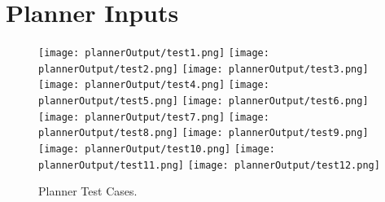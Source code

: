 
\section{Planner Inputs}
\label{app:planner_inputs}


\begin{figure}[ht!]
 \centering
 \texttt{[image: plannerOutput/test1.png]}
 \texttt{[image: plannerOutput/test2.png]}
 \texttt{[image: plannerOutput/test3.png]}
 \texttt{[image: plannerOutput/test4.png]}
 \texttt{[image: plannerOutput/test5.png]}
 \texttt{[image: plannerOutput/test6.png]}
 \texttt{[image: plannerOutput/test7.png]}
 \texttt{[image: plannerOutput/test8.png]}
 \texttt{[image: plannerOutput/test9.png]}
 \texttt{[image: plannerOutput/test10.png]}
 \texttt{[image: plannerOutput/test11.png]}
 \texttt{[image: plannerOutput/test12.png]}
 \caption{Planner Test Cases.}
 \label{fig:planner_tests}
\end{figure}


